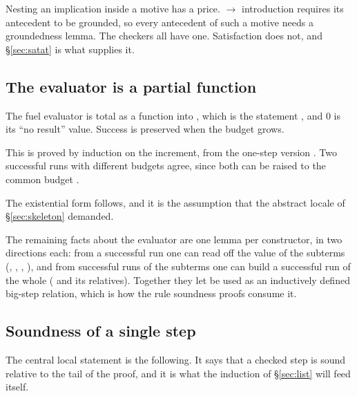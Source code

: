 Nesting an implication inside a motive has a price.  $\longrightarrow$ introduction
requires its antecedent to be grounded, so every antecedent of such a motive
needs a groundedness lemma.  The checkers all have one.  Satisfaction does not,
and \S\ref{sec:satat} is what supplies it.

\subsection{The evaluator is a partial function}

The fuel evaluator is total as a function into , which is the
statement , and $0$ is
its ``no result'' value.  Success is preserved when the budget grows.


\noindent
This is proved by induction on the increment, from the one-step version
.  Two successful runs with different budgets
agree, since both can be raised to the common budget .


\noindent
The existential form follows, and it is the assumption  that
the abstract locale of \S\ref{sec:skeleton} demanded.


\noindent
The remaining facts about the evaluator are one lemma per constructor, in two
directions each: from a successful run one can read off the value of the
subterms (, ,
, ), and from
successful runs of the subterms one can build a successful run of the whole
( and its relatives).  Together they let  be
used as an inductively defined big-step relation, which is how the rule
soundness proofs consume it.

\subsection{Soundness of a single step}

The central local statement is the following.  It says that a checked step is
sound relative to the tail of the proof, and it is what the induction of
\S\ref{sec:list} will feed itself.


